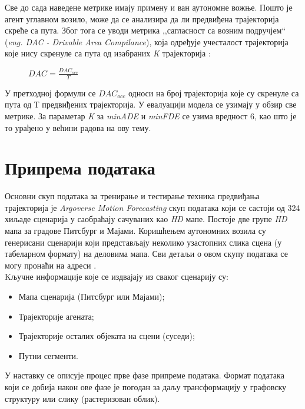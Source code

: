 \documentclass[11pt,oneside]{memoir}
\begin{document}
Све до сада наведене метрике имају примену и ван аутономне вожње. Пошто је агент углавном возило, може да
се анализира да ли предвиђена трајекторија скреће са пута. Због тога се уводи метрика ,,сагласност са возним подручјем`` 
(\textit{eng. DAC - Drivable Area Compilance}), која одређује учесталост трајекторија које нису скренуле са пута од изабраних 
\textit{K} трајекторија \cite{argoverse}:

\begin{figure}[H]
  \centering
  $DAC = \frac{DAC_{occ}}{T}$
\end{figure}

У претходној формули се $DAC_{occ}$ односи на број трајекторија које су скренуле са пута од Т предвиђених трајекторија. 
У евалуацији модела се узимају у обзир све метрике. За параметар \textit{K} за \textit{minADE} и \textit{minFDE} се узима вредност 6,
као што је то урађено у већини радова на ову тему.

\chapter{Припрема података \label{initprep}}

Основни скуп података за тренирање и тестирање техника предвиђања трајекторија је \textit{Argoverse Motion Forecasting} скуп података
који се састоји од 324 хиљаде сценарија у саобраћају сачуваних као \textit{HD} мапе. Постоје две групе \textit{HD} мапа
за градове Питсбург и Мајами. Коришћењем аутономних возила су генерисани сценарији који представљају неколико узастопних слика сцена (у табеларном формату)
на деловима мапа. Сви детаљи о овом скупу података се могу пронаћи на адреси 
\href{https://www.argoverse.org/index.html}{\color{blue}{www.argoverse.org}} \cite{argoverse}. \\


\noindent Kључне информације које се издвајају из сваког сценарију су:
\begin{itemize}
  \item Мапа сценарија (Питсбург или Мајами);
  \item Трајекторије агената;
  \item Трајекторије осталих објеката на сцени (суседи);
  \item Путни сегменти.
\end{itemize}

У наставку се описује процес прве фазе припреме података. Формат података који се добија након ове фазе је погодан
за даљу трансформацију у графовску структуру или слику (растеризован облик).
\end{document}
